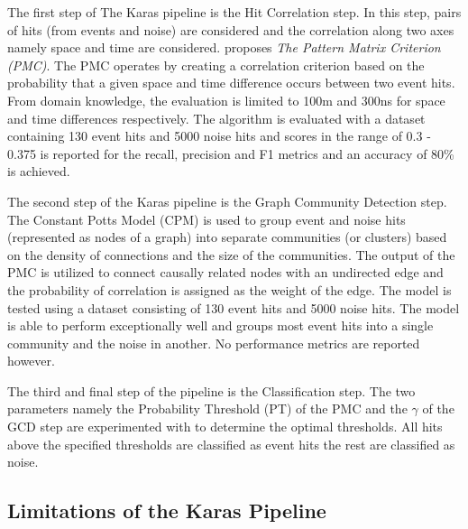 The first step of The Karas pipeline is the Hit Correlation step. In this
step, pairs of hits (from events and noise) are considered and the correlation
along two axes namely space and time are
considered. \citeauthor{karas2019data} proposes \textit{The Pattern Matrix
Criterion (PMC)}. The PMC operates by creating a correlation criterion based
on the probability that a given space and time difference occurs between two
event hits. From domain knowledge, the evaluation is limited to 100m and 300ns
for space and time differences respectively. The algorithm is evaluated with
a dataset containing 130 event hits and 5000 noise hits and scores in the
range of 0.3 - 0.375 is reported for the recall, precision and F1 metrics
and an accuracy of 80\% is achieved.

The second step of the Karas pipeline is the Graph Community Detection
step. The Constant Potts Model (CPM) is used to group event and noise hits
(represented as nodes of a graph) into separate communities (or clusters)
based on the density of connections and the size of the communities. The
output of the PMC is utilized to connect causally related nodes with an
undirected edge and the probability of correlation is assigned as the weight
of the edge. The model is tested using a dataset consisting of 130 event hits
and 5000 noise hits. The model is able to perform exceptionally well and
groups most event hits into a single community and the noise in another. No
performance metrics are reported however.

The third and final step of the pipeline is the Classification step. The two
parameters namely the Probability Threshold (PT) of the PMC and the $\gamma$
of the GCD step are experimented with to determine the optimal thresholds. All
hits above the specified thresholds are classified as event hits the rest are
classified as noise.

\subsection{Limitations of the Karas Pipeline}
\label{sec:karas-pipeline-limitations}



